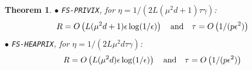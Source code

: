 \documentclass[twoside]{article}
\newtheorem{theorem}{Theorem}
\begin{document}
\begin{theorem}
\noindent $\bullet$ \texttt{FS-PRIVIX}, for $\eta=1/(2L(\mu^2d+1)\tau\gamma)$: 
\begin{equation}\notag
R=O\left(L(\mu^2d+1)\epsilon \log(1/\epsilon)\right) \quad \textrm{and} \quad \tau=O\left(1/(p\epsilon^2)\right)
 \end{equation}
\noindent $\bullet$ \texttt{FS-HEAPRIX}, for $\eta=1/(2L\mu^2d\tau\gamma)$:
\begin{equation}\notag
R=O\left(L(\mu^2d)\epsilon \log(1/\epsilon)\right) \quad \textrm{and} \quad \tau=O\left(1/(p\epsilon^2)\right)
 \end{equation}
 \end{theorem}







%
\end{document}
